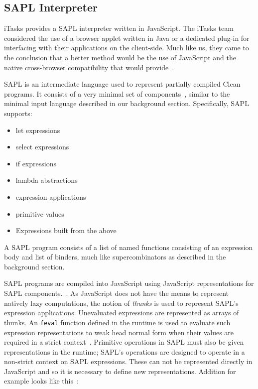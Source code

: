 \subsection{SAPL Interpreter}
iTasks provides a SAPL interpreter written in JavaScript. The iTasks
team considered the use of a browser applet written in Java or a
dedicated plug-in for interfacing with their applications on the 
client-side. Much like us, they came to the conclusion that a better
method would be the use of JavaScript and the native cross-browser 
compatibility that would provide~\cite[pp.77]{JEL}.  

SAPL is an intermediate language used to represent partially compiled
Clean programs. It consists of a very minimal set of components~\cite[pp.79]{JEL}, 
similar to the minimal input language described in our background
section. Specifically, SAPL supports:

\begin{itemize}
  \item let expressions
  \item select expressions
  \item if expressions
  \item lambda abstractions
  \item expression applications
  \item primitive values
  \item Expressions built from the above
\end{itemize}

\noindent A SAPL program consists of a list of named functions consisting
of an expression body and list of binders, much like supercombinators as
described in the background section.

SAPL programs are compiled into JavaScript using JavaScript representations
for SAPL components.~\cite[pp.79]{JEL}. As JavaScript does not have the
means to represent natively lazy computations, the notion of \emph{thunks} is
used to represent SAPL's expression applications. Unevaluated expressions
are represented as arrays of thunks. An \verb!feval! function defined in the runtime is 
used to evaluate such expression representations to weak head normal form
when their values are required in a strict context~\cite[pp.84]{JEL}. Primitive operations in SAPL 
must also be given representations in the runtime; SAPL's operations are
designed to operate in a non-strict context on SAPL expressions. These
can not be represented directly in JavaScript and so it is necessary
to define new representations. Addition for example looks like this~\cite[pp.83]{JEL}:

